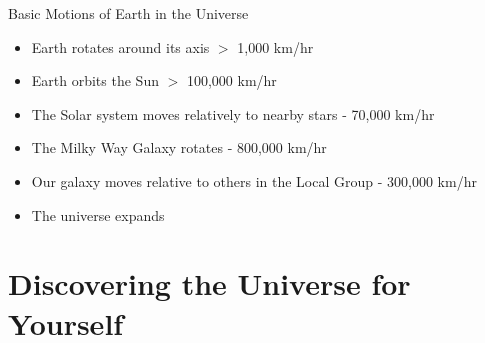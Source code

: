 \documentclass[12pt]{article}
\begin{document}
Basic Motions of Earth in the Universe \begin{itemize} 
\item Earth rotates around its axis $>$ 1,000 km/hr 
\item Earth orbits the Sun $>$ 100,000 km/hr
\item The Solar system moves relatively to nearby stars - 70,000 km/hr
\item The Milky Way Galaxy rotates - 800,000 km/hr 
\item Our galaxy moves relative to others in the Local Group - 300,000 km/hr
\item The universe expands \end{itemize} 

\section{Discovering the Universe for Yourself}
\end{document}
